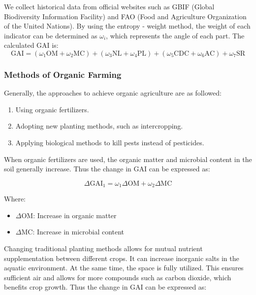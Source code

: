 \documentclass[12pt]{article}  %
\begin{document}
We collect historical data from official websites such as GBIF (Global Biodiversity Information Facility) and FAO (Food and Agriculture Organization of the United Nations). By using the entropy - weight method, the weight of each indicator can be determined as $\omega_i$, which represents the angle of each part. The calculated GAI is:
\begin{equation}
\text{GAI}=(\omega_1\text{OM}+\omega_2\text{MC})+(\omega_3\text{NL}+\omega_4\text{PL})+(\omega_5\text{CDC}+\omega_6\text{AC})+\omega_7\text{SR}
\end{equation}

\subsubsection{Methods of Organic Farming}
Generally, the approaches to achieve organic agriculture are as followed:
\begin{enumerate}
    \item Using organic fertilizers.
    \item Adopting new planting methods, such as intercropping.
    \item Applying biological methods to kill pests instead of pesticides.
\end{enumerate}


When organic fertilizers are used, the organic matter and microbial content in the soil generally increase. Thus the change in GAI can be expressed as:

\begin{equation}
\Delta\text{GAI}_1 = \omega_1 \Delta\text{OM} + \omega_2 \Delta\text{MC}
\end{equation}

Where:
\begin{itemize}
    \item $\Delta\text{OM}$: Increase in organic matter
    \item $\Delta\text{MC}$: Increase in microbial content
\end{itemize}


Changing traditional planting methods allows for mutual nutrient supplementation between different crops. It can increase inorganic salts in the aquatic environment. At the same time, the space is fully utilized. This ensures sufficient air and allows for more compounds such as carbon dioxide, which benefits crop growth. Thus the change in GAI can be expressed as:
\end{document}
